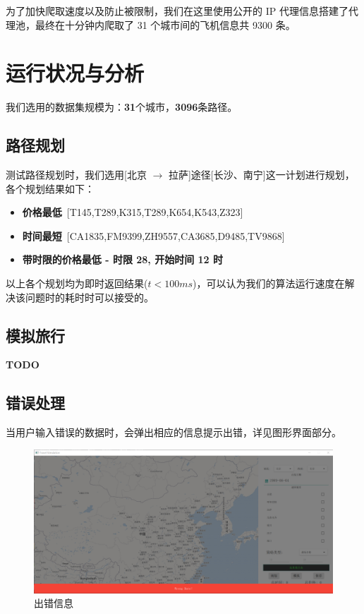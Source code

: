 \documentclass[lang=cn,blue]{elegantbook}
\begin{document}
为了加快爬取速度以及防止被限制，我们在这里使用公开的 IP 代理信息搭建了代理池，最终在十分钟内爬取了 31 个城市间的飞机信息共 9300 条。

\chapter{运行状况与分析}
我们选用的数据集规模为：\textbf{31}个城市，\textbf{3096}条路径。

\section{路径规划}
测试路径规划时，我们选用[北京 $\to$ 拉萨]途径[长沙、南宁]这一计划进行规划，各个规划结果如下：

\begin{itemize}
	\item \textbf{价格最低}\ [T145,T289,K315,T289,K654,K543,Z323]
	\item \textbf{时间最短}\ [CA1835,FM9399,ZH9557,CA3685,D9485,TV9868]
	\item \textbf{带时限的价格最低 - 时限 28, 开始时间 12 时}\newline [CZ3128,CZ3130,D3634,ZH3886,3U8936,CZ8165]
\end{itemize}

以上各个规划均为即时返回结果($t < 100ms$)，可以认为我们的算法运行速度在解决该问题时的耗时时可以接受的。

\section{模拟旅行}

\textbf{TODO}

\section{错误处理}
当用户输入错误的数据时，会弹出相应的信息提示出错，详见图形界面部分。
\begin{figure}[!htbp]
	\centering
	\includegraphics[width=1\textwidth]{exception.png}
	\caption{出错信息}
	\label{error}
\end{figure}
\end{document}
